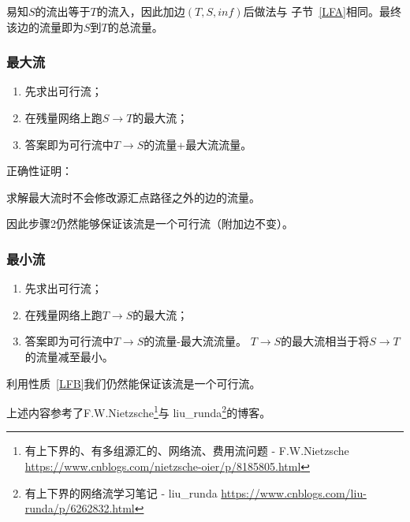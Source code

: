 易知$S$的流出等于$T$的流入，因此加边$(T,S,inf)$后做法与
子节~\ref{LFA}相同。最终该边的流量即为$S$到$T$的总流量。

\subsubsection{最大流}

\begin{enumerate}
    \item 先求出可行流；
    \item 在残量网络上跑$S\rightarrow T$的最大流；
    \item 答案即为可行流中$T\rightarrow S$的流量+最大流流量。
\end{enumerate}

正确性证明：

\begin{property}\label{LFB}
    求解最大流时不会修改源汇点路径之外的边的流量。
\end{property}

因此步骤2仍然能够保证该流是一个可行流（附加边不变）。

\subsubsection{最小流}

\begin{enumerate}
    \item 先求出可行流；
    \item 在残量网络上跑$T\rightarrow S$的最大流；
    \item 答案即为可行流中$T\rightarrow S$的流量-最大流流量。
    $T\rightarrow S$的最大流相当于将$S\rightarrow T$的流量减至最小。
\end{enumerate}

利用性质~\ref{LFB}我们仍然能保证该流是一个可行流。

上述内容参考了F.W.Nietzsche\footnote{有上下界的、有多组源汇的、网络流、费用流问题 - F.W.Nietzsche
\url{https://www.cnblogs.com/nietzsche-oier/p/8185805.html}}与
liu\_runda\footnote{有上下界的网络流学习笔记 - liu\_runda
\url{https://www.cnblogs.com/liu-runda/p/6262832.html}}的博客。
